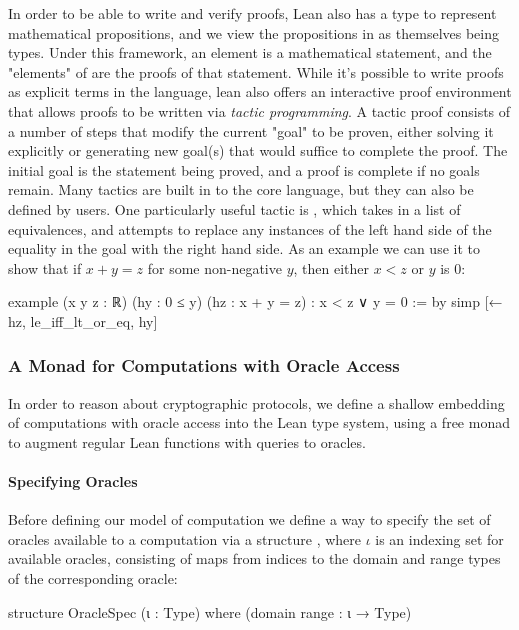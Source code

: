In order to be able to write and verify proofs, Lean also has a type  to represent mathematical propositions, and we view the propositions in  as themselves being types.
Under this framework, an element  is a mathematical statement, and the "elements" of  are the proofs of that statement.  While it's possible to write proofs as explicit terms in the language, lean also offers an interactive proof environment that allows proofs to be written via \textit{tactic programming}.
A tactic proof consists of a number of steps that modify the current "goal" to be proven, either solving it explicitly or generating new goal(s) that would suffice to complete the proof.
The initial goal is the statement being proved, and a proof is complete if no goals remain.
Many tactics are built in to the core language, but they can also be defined by users.
One particularly useful tactic is , which takes in a list of equivalences, and attempts to replace any instances of the left hand side of the equality in the goal with the right hand side. 
As an example we can use it to show that if $x + y = z$ for some non-negative $y$, then either $x < z$ or $y$ is $0$:

\begin{leancode}
  example (x y z : ℝ) (hy : 0 ≤ y)
      (hz : x + y = z) : x < z ∨ y = 0 :=
    by simp [← hz, le_iff_lt_or_eq, hy]
\end{leancode}

\subsubsection{A Monad for Computations with Oracle Access} \label{OracleComp}
In order to reason about cryptographic protocols, we define a shallow embedding of computations with oracle access into the Lean type system, using a free monad to augment regular Lean functions with queries to oracles.

\paragraph{Specifying Oracles}
Before defining our model of computation we define a way to specify the set of oracles available to a computation via a structure , where $\iota$ is an indexing set for available oracles, consisting of maps from indices to the domain and range types of the corresponding oracle:
\begin{leancode}
  structure OracleSpec (ι : Type) where (domain range : ι → Type)
\end{leancode}

